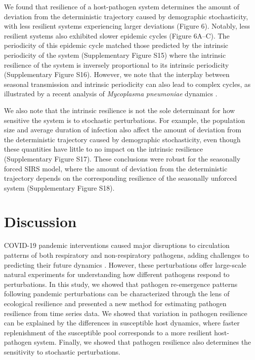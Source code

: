 \documentclass[12pt]{article}
\begin{document}
We found that resilience of a host-pathogen system determines the amount of deviation from the deterministic trajectory caused by demographic stochasticity, with less resilient systems experiencing larger deviations (Figure 6).
Notably, less resilient systems also exhibited slower epidemic cycles (Figure 6A--C). 
The periodicity of this epidemic cycle matched those predicted by the intrinsic periodicity of the system (Supplementary Figure S15) where the intrinsic resilience of the system is inversely proportional to its intrinsic periodicity (Supplementary Figure S16).
However, we note that the interplay between seasonal transmission and intrinsic periodicity can also lead to complex cycles, as illustrated by a recent analysis of \textit{Mycoplasma pneumoniae} dynamics \citep{nielsen2025complex}.

We also note that the intrinsic resilience is not the sole determinant for how sensitive the system is to stochastic perturbations.
For example, the population size and average duration of infection also affect the amount of deviation from the deterministic trajectory caused by demographic stochasticity, even though these quantities have little to no impact on the intrinsic resilience (Supplementary Figure S17).
These conclusions were robust for the seasonally forced SIRS model, where the amount of deviation from the deterministic trajectory depends on the corresponding resilience of the seasonally unforced system (Supplementary Figure S18).

\section*{Discussion}

COVID-19 pandemic interventions caused major disruptions to circulation patterns of both respiratory and non-respiratory pathogens, adding challenges to predicting their future dynamics \citep{baker2020impact,gomez2021uncertain,koltai2022determinants,park2024predicting}.
However, these perturbations offer large-scale natural experiments for understanding how different pathogens respond to perturbations.
In this study, we showed that pathogen re-emergence patterns following pandemic perturbations can be characterized through the lens of ecological resilience and presented a new method for estimating pathogen resilience from time series data.
We showed that variation in pathogen resilience can be explained by the differences in susceptible host dynamics, where faster replenishment of the susceptible pool corresponds to a more resilient host-pathogen system.
Finally, we showed that pathogen resilience also determines the sensitivity to stochastic perturbations.
\end{document}
